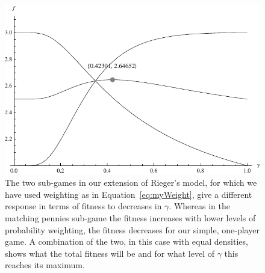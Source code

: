 \documentclass[a4paper,10pt]{article}
\numberwithin{equation}{section}
\begin{document}
\begin{figure}[h]
\begin{center}
\leavevmode
\includegraphics[scale=.68]{Graph7.pdf}
\captionsetup{width=360pt}
\caption{The two sub-games in our extension of Rieger's model, for which we have used weighting as in Equation~\ref{eq:myWeight}, give a different response in terms of fitness to decreases in $\gamma$. Whereas in the matching pennies sub-game the fitness increases with lower levels of probability weighting, the fitness decreases for our simple, one-player game. A combination of the two, in this case with equal densities, shows what the total fitness will be and for what level of $\gamma$ this reaches its maximum.}
\label{fig:Graph7.pdf}
\end{center}
\end{figure}
\end{document}
